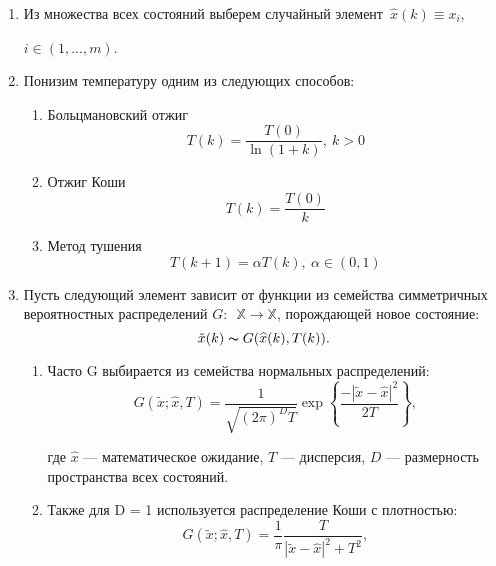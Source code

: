 \begin{enumerate}
	\item  Из множества всех состояний выберем случайный элемент~$\widehat{x}(k) \equiv x_i$,

	$i \in (1, ..., m)$.

	\item Понизим температуру одним из следующих способов:

		\begin{enumerate}
			\item Больцмановский отжиг
			\begin{equation}
			T(k) =  \dfrac{T(0)}{\ln (1 + k)}, \ k > 0
			\label{eq:boltzman}
			\end{equation}

			\item Отжиг Коши
			\begin{equation}
			T(k)  =  \dfrac{T(0)}{k}
			\end{equation}

			\item Метод тушения
			\begin{equation}
			T(k+1) = \alpha T(k),\ \alpha \in (0, 1)
			\end{equation}

		\end{enumerate}


	\item Пусть следующий элемент зависит от функции из семейства симметричных вероятностных распределений $G:$~$ \mathbb{X} \to \mathbb{X}$, порождающей новое состояние:
	\[
	\tilde{x}(k) \thicksim G(\widehat{x}(k), T(k)).
	\]

	\begin{enumerate}

		\item Часто G выбирается из семейства нормальных распределений:
		\begin{equation}
		\label{eq:normal_G}
		G(\tilde{x}; \widehat{x}, T)
		=
		\dfrac{1}
		{\sqrt{(2\pi)^{D} T}}
		\exp
		\left\lbrace
		\dfrac{- |\tilde{x} - \widehat{x}|^2}{2T}
		\right\rbrace,
		\end{equation}

		где $\widehat{x}$ — математическое ожидание, $T$  — дисперсия, $D$ — размерность пространства всех состояний.

		\item Также для D = 1 используется распределение Коши с плотностью:
		\begin{equation}
		G(\tilde{x}; \widehat{x}, T)
		=
		\dfrac{1}{\pi}
		\dfrac{T}{|\tilde{x}- \widehat{x}|^2 + T^2},
		\end{equation}


\end{enumerate}
\end{enumerate}
